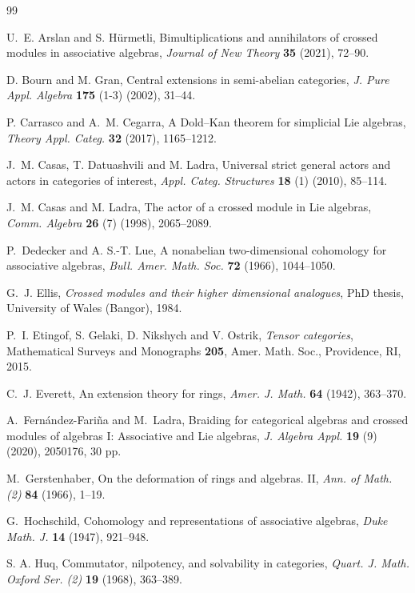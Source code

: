 \documentclass[12pt,reqno]{amsart}
\theoremstyle{plain}
\theoremstyle{definition}
\theoremstyle{remark}
\numberwithin{equation}{section}
\begin{document}
\begin{thebibliography}{99}
	
 U.~E. Arslan  and S. H\"urmetli, Bimultiplications and annihilators of crossed modules in
	associative algebras,  \emph{Journal of New Theory} \textbf{35} (2021),  72--90.
	
 D. Bourn and M. Gran, Central extensions in semi-abelian categories, \emph{J. Pure Appl. Algebra} \textbf{175} (1-3) (2002),  31--44.
	
P. Carrasco and A.~M. Cegarra, A Dold--Kan theorem for simplicial Lie algebras, \emph{Theory Appl. Categ.} \textbf{32} (2017), 1165--1212.

J.~M. Casas, T.  Datuashvili and M. Ladra, 
Universal strict general actors and actors in categories of interest,
\emph{Appl. Categ. Structures} \textbf{18} (1) (2010),  85--114.

J.~M. Casas and M. Ladra, The actor of a crossed module in Lie algebras, \emph{Comm. Algebra} \textbf{26} (7) (1998), 2065--2089.

 P.~Dedecker and A. S.-T. Lue, 
A nonabelian two-dimensional cohomology for associative algebras,
\emph{Bull. Amer. Math. Soc.} \textbf{72} (1966), 1044--1050.

G.~J. Ellis,  \emph{Crossed modules and their higher dimensional analogues}, PhD thesis, University of Wales (Bangor), 1984.

  P.~I. Etingof, S. Gelaki, D. Nikshych and V. Ostrik, \emph{Tensor categories}, Mathematical Surveys and Monographs \textbf{205}, Amer. Math. Soc., Providence, RI, 2015.

  C.~J. Everett, An extension theory for rings, \emph{Amer. J. Math.} \textbf{64} (1942), 363--370.

  A.~Fern\'andez-Fari\~na and M.~Ladra,   Braiding for categorical algebras and crossed modules of algebras I: Associative and Lie algebras, \emph{J. Algebra Appl.} \textbf{19} (9) (2020), 2050176, 30 pp.

   M.~Gerstenhaber, On the deformation of rings and algebras. II,
\emph{Ann. of Math. (2)} \textbf{84} (1966), 1--19.

  G.~Hochschild, Cohomology and representations of associative algebras, \emph{Duke Math. J.} \textbf{14} (1947), 921--948.

  S. A. Huq,  Commutator, nilpotency, and solvability in categories, \emph{Quart. J. Math.
  Oxford Ser. (2)} \textbf{19}  (1968), 363--389.
 

\end{thebibliography}
\end{document}

